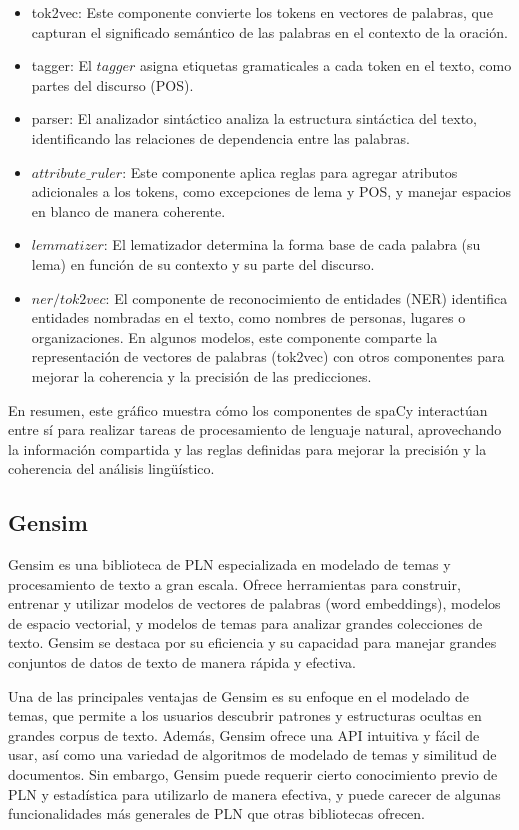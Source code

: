 \begin{itemize}
	\item tok2vec: Este componente convierte los tokens en vectores de palabras, que capturan el significado semántico de las palabras en el contexto de la oración.
	\item tagger: El $tagger$ asigna etiquetas gramaticales a cada token en el texto, como partes del discurso (POS).
	\item  parser: El analizador sintáctico analiza la estructura sintáctica del texto, identificando las relaciones de dependencia entre las palabras. 
	\item $attribute\_ruler$: Este componente aplica reglas para agregar atributos adicionales a los tokens, como excepciones de lema y POS, y manejar espacios en blanco de manera coherente.
	\item $lemmatizer$: El lematizador determina la forma base de cada palabra (su lema) en función de su contexto y su parte del discurso.
	\item $ner/tok2vec$: El componente de reconocimiento de entidades (NER) identifica entidades nombradas en el texto, como nombres de personas, lugares o organizaciones. En algunos modelos, este componente comparte la representación de vectores de palabras (tok2vec) con otros componentes para mejorar la coherencia y la precisión de las predicciones.
\end{itemize}
En resumen, este gráfico muestra cómo los componentes de spaCy interactúan entre sí para realizar tareas de procesamiento de lenguaje natural, aprovechando la información compartida y las reglas definidas para mejorar la precisión y la coherencia del análisis lingüístico.

\subsection{Gensim}

Gensim es una biblioteca de PLN especializada en modelado de temas y procesamiento de texto a gran escala. Ofrece herramientas para construir, entrenar y utilizar modelos de vectores de palabras (word embeddings), modelos de espacio vectorial, y modelos de temas para analizar grandes colecciones de texto. Gensim se destaca por su eficiencia y su capacidad para manejar grandes conjuntos de datos de texto de manera rápida y efectiva.

Una de las principales ventajas de Gensim es su enfoque en el modelado de temas, que permite a los usuarios descubrir patrones y estructuras ocultas en grandes corpus de texto. Además, Gensim ofrece una API intuitiva y fácil de usar, así como una variedad de algoritmos de modelado de temas y similitud de documentos. Sin embargo, Gensim puede requerir cierto conocimiento previo de PLN y estadística para utilizarlo de manera efectiva, y puede carecer de algunas funcionalidades más generales de PLN que otras bibliotecas ofrecen.

